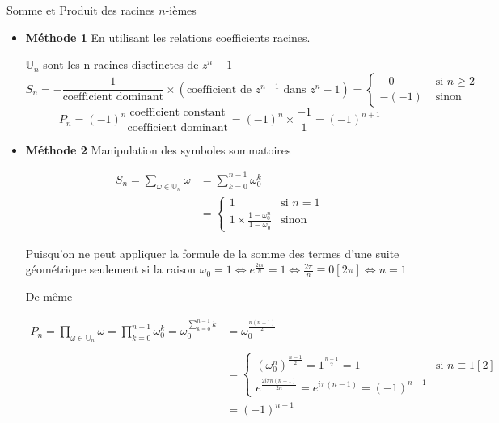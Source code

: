 \documentclass{article}
\begin{document}
\begin{question_kholle}{Somme et Produit des racines $n$-ièmes}
    \begin{itemize}[label=$\lozenge$]
        \item \textbf{Méthode 1} En utilisant les relations coefficients racines.

        $\mathbb{U}_{n}$ sont les n racines disctinctes de $z^{n}-1$
        $$S_{n} = - \frac{1}{\text{coefficient dominant}}\times(\text{coefficient de }z^{n-1} \text{ dans }z^{n}-1)= \left\{ \begin{array}{ll}
            -0  & \text{ si }  n\geqslant 2 \\
            -(-1)   & \text{ sinon}
        \end{array}\right.$$
        $$
        P_{n} = (-1)^{n} \frac{\text{coefficient constant}}{\text{coefficient dominant}} = (-1) ^{n}\times \frac{-1}{1} = (-1)^{n+1}
        $$
        
        \item \textbf{Méthode 2} Manipulation des symboles sommatoires
        
        \begin{align*}
            S_{n} = \sum_{\omega \in \mathbb{U}_{n}}\omega &= \sum_{k=0}^{n-1}\omega_{0}^{k}\\
            &= \left\{ \begin{array}{ll}
                1 & \text{si }  n =1 \\
                1 \times \frac{1 - \omega_{0}^{n}}{1-\omega_{0}}  & \text{sinon}
            \end{array}\right.
        \end{align*}
        
        Puisqu'on ne peut appliquer la formule de la somme des termes d'une suite géométrique seulement si la raison $\omega_{0} = 1 \iff e^{\frac{2i\pi}{n}} = 1 \iff \frac{2\pi}{n} \equiv 0 [2\pi] \iff n = 1$
        
        De même
        
        \begin{align*}
            P_{n} = \prod_{\omega \in \mathbb{U}_{n}}\omega = \prod_{k=0}^{n-1}\omega_{0}^{k}= \omega_{0}^{\sum_{k=0}^{n-1}k} &= \omega_{0} ^{\frac{n(n-1)}{2}}\\ \\
            &=\left\{ \begin{array}{ll}
                (\omega_{0}^{n})^{\frac{n-1}{2}} = 1^{\frac{n-1}{2}} = 1 & \text{si } n \equiv 1 [2] \\
                e^{\frac{2i\pi n(n-1)}{2n}} = e^{i \pi(n-1)} = (-1)^{n-1}
            \end{array}\right.
            \\ &= (-1)^{n-1}
        \end{align*}
    \end{itemize}
\end{question_kholle}
\end{document}
